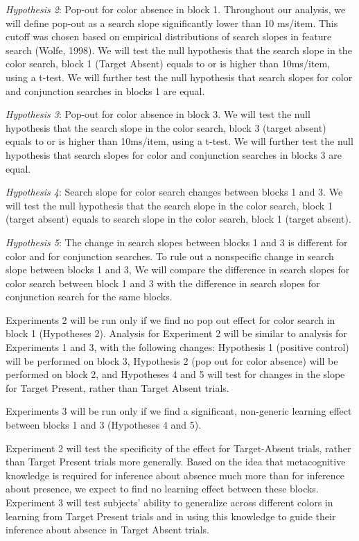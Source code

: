\documentclass[
  english,
  man]{apa6}
\begin{document}
\emph{Hypothesis 2}: Pop-out for color absence in block 1. Throughout our analysis, we will define pop-out as a search slope significantly lower than 10 ms/item. This cutoff was chosen based on empirical distributions of search slopes in feature search (Wolfe, 1998). We will test the null hypothesis that the search slope in the color search, block 1 (Target Absent) equals to or is higher than 10ms/item, using a t-test. We will further test the null hypothesis that search slopes for color and conjunction searches in blocks 1 are equal.

\emph{Hypothesis 3}: Pop-out for color absence in block 3. We will test the null hypothesis that the search slope in the color search, block 3 (target absent) equals to or is higher than 10ms/item, using a t-test. We will further test the null hypothesis that search slopes for color and conjunction searches in blocks 3 are equal.

\emph{Hypothesis 4}: Search slope for color search changes between blocks 1 and 3. We will test the null hypothesis that the search slope in the color search, block 1 (target absent) equals to search slope in the color search, block 1 (target absent).

\emph{Hypothesis 5}: The change in search slopes between blocks 1 and 3 is different for color and for conjunction searches. To rule out a nonspecific change in search slope between blocks 1 and 3, We will compare the difference in search slopes for color search between block 1 and 3 with the difference in search slopes for conjunction search for the same blocks.

Experiments 2 will be run only if we find no pop out effect for color search in block 1 (Hypotheses 2). Analysis for Experiment 2 will be similar to analysis for Experiments 1 and 3, with the following changes: Hypothesis 1 (positive control) will be performed on block 3, Hypothesis 2 (pop out for color absence) will be performed on block 2, and Hypotheses 4 and 5 will test for changes in the slope for Target Present, rather than Target Absent trials.

Experiments 3 will be run only if we find a significant, non-generic learning effect between blocks 1 and 3 (Hypotheses 4 and 5).

Experiment 2 will test the specificity of the effect for Target-Absent trials, rather than Target Present trials more generally. Based on the idea that metacognitive knowledge is required for inference about absence much more than for inference about presence, we expect to find no learning effect between these blocks. Experiment 3 will test subjects' ability to generalize across different colors in learning from Target Present trials and in using this knowledge to guide their inference about absence in Target Absent trials.
\end{document}
